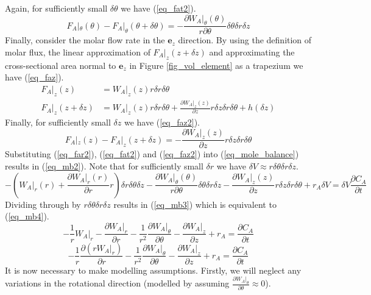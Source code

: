 \documentclass[11pt,fleqn]{article}
\theoremstyle{defstyle}
\begin{document}
Again, for sufficiently small $\delta \theta$ we have (\ref{eq_fat2}).
\begin{equation}
F_A|_\theta(\theta) - F_A|_\theta(\theta + \delta \theta) =- \frac{\partial W_A|_\theta(\theta)}{r \partial \theta}\delta \theta\delta r \delta z
\label{eq_fat2} 
\end{equation}
Finally, consider the molar flow rate in the $\mathbf{e}_z$ direction. By using the definition of molar flux, the linear approximation of $F_A|_z(z+\delta z)$ and approximating the cross-sectional area normal to $\mathbf{e}_z$ in Figure \ref{fig_vol_element} as a trapezium we have (\ref{eq_faz}).
\begin{equation}
\begin{aligned}
F_A|_z(z) &= W_A|_z(z) r \delta r \delta \theta \\
F_A|_z(z + \delta z) &= W_A|_z(z) r \delta r \delta \theta + \frac{\partial W_A|_z(z)}{\partial z}r \delta z \delta r \delta \theta + h(\delta z)
\end{aligned}
\label{eq_faz}
\end{equation}
Finally, for sufficiently small $\delta z$ we have (\ref{eq_faz2}).
\begin{equation}
F_A|_z(z) - F_A|_z(z + \delta z) = - \frac{\partial W_A|_z(z)}{\partial z}r \delta z \delta r \delta \theta
\label{eq_faz2}
\end{equation}
Substituting (\ref{eq_far2}), (\ref{eq_fat2}) and (\ref{eq_faz2}) into (\ref{eq_mole_balance}) results in (\ref{eq_mb2}). Note that for sufficiently small $\delta r$ we have $\delta V \approx r \delta \theta \delta r \delta z$.
\begin{equation}
- (W_ A|_r(r)  + \frac{\partial W_A|_r(r)}{\partial r}r) \delta r \delta \theta \delta z - \frac{\partial W_A|_\theta(\theta)}{r \partial \theta}\delta \theta\delta r \delta z - \frac{\partial W_A|_z(z)}{\partial z}r \delta z \delta r \delta \theta + r_A \delta V = \delta V \frac{\partial C_A}{\partial t}
\label{eq_mb2}
\end{equation}
Dividing through by $r \delta \theta \delta r \delta z$ results in (\ref{eq_mb3}) which is equivalent to (\ref{eq_mb4}).
\begin{equation}
-\frac{1}{r} W_A|_r - \frac{\partial W_A|_r}{\partial r} - \frac{1}{r^2}\frac{\partial W_A|_\theta}{\partial \theta} - \frac{\partial W_A|_z}{\partial z}+ r_A  = \frac{\partial C_A}{\partial t}
\label{eq_mb3}
\end{equation}
\begin{equation}
-\frac{1}{r} \frac{\partial (rW_A|_r)}{\partial r} - \frac{1}{r^2}\frac{\partial W_A|_\theta}{\partial \theta} - \frac{\partial W_A|_z}{\partial z}+ r_A  = \frac{\partial C_A}{\partial t}
\label{eq_mb4}
\end{equation}
It is now necessary to make modelling assumptions. Firstly, we will neglect any variations in the rotational direction (modelled by assuming $\frac{\partial W_A|_\theta}{\partial \theta} \approx 0$).
\end{document}
